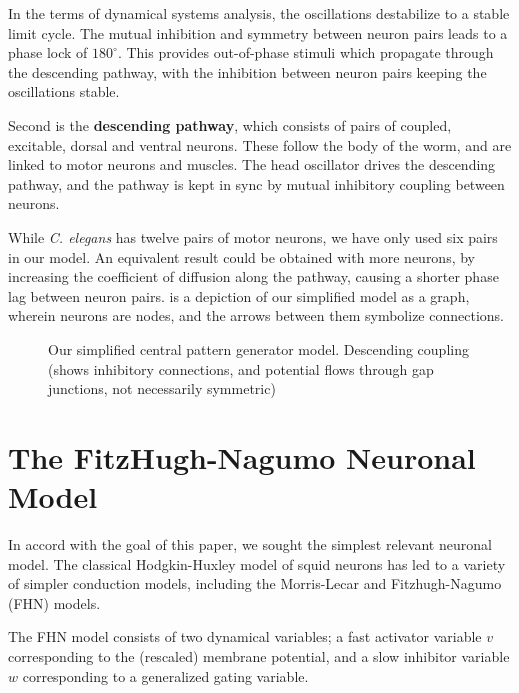 \documentclass[
    11pt,
]{article}
\begin{document}
In the terms of dynamical systems analysis, the oscillations destabilize to a stable limit cycle.  The mutual inhibition and symmetry between neuron pairs leads to a phase lock of $180^\circ$.  This provides out-of-phase stimuli which propagate through the descending pathway, with the inhibition between neuron pairs keeping the oscillations stable.

Second is the \textbf{descending pathway}, which consists of pairs of coupled, excitable, dorsal and ventral neurons.  These follow the body of the worm, and are linked to motor neurons and muscles.  The head oscillator drives the descending pathway, and the pathway is kept in sync by mutual inhibitory coupling between neurons.

While \textit{C. elegans} has twelve pairs of motor neurons, we have only used six pairs in our model.  An equivalent result could be obtained with more neurons, by increasing the coefficient of diffusion along the pathway, causing a shorter phase lag between neuron pairs.   is a depiction of our simplified model as a graph, wherein neurons are nodes, and the arrows between them symbolize connections.

\begin{figure}[h!]
    \ContinuedFloat
    \centering
    \label{fig: cpg}
    \caption{Our simplified central pattern generator model.  Descending coupling (shows inhibitory connections, and potential flows through gap junctions, not necessarily symmetric)}
\end{figure} %

\section{The FitzHugh-Nagumo Neuronal Model}\label{sec: fhn}

In accord with the goal of this paper, we sought the simplest relevant neuronal model.  The classical Hodgkin-Huxley\cite{hodgkin1952} model of squid neurons has led to a variety of simpler conduction models, including the Morris-Lecar\cite{morris1981} and Fitzhugh-Nagumo (FHN) models.

The FHN model consists of two dynamical variables; a fast activator variable $v$ corresponding to the (rescaled) membrane potential, and a slow inhibitor variable $w$ corresponding to a generalized gating variable.
\end{document}
